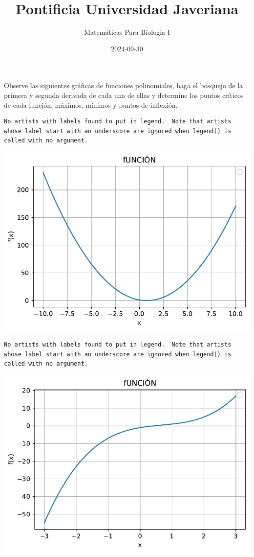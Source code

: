\documentclass[
]{article}
\title{Pontificia Universidad Javeriana}
\author{Matemáticas Para Biologia I}
\date{2024-09-30}
\begin{document}
\maketitle


Observe las siguientes gráficas de funciones polinomiales, haga el
bosquejo de la primera y segunda derivada de cada una de ellas y
determine los puntos críticos de cada función, máximos, mínimos y puntos
de inflexión.

\begin{verbatim}
No artists with labels found to put in legend.  Note that artists whose label start with an underscore are ignored when legend() is called with no argument.
\end{verbatim}

\includegraphics{taller_files/figure-pdf/cell-2-output-2.pdf}

\begin{verbatim}
No artists with labels found to put in legend.  Note that artists whose label start with an underscore are ignored when legend() is called with no argument.
\end{verbatim}

\includegraphics{taller_files/figure-pdf/cell-3-output-2.pdf}
\end{document}
